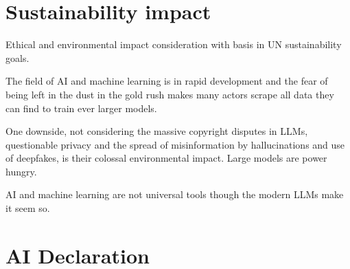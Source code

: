 \documentclass[../../thesis.tex]{subfiles}
\begin{document}
\section{Sustainability impact}
Ethical and environmental impact consideration with basis in UN sustainability goals.

The field of AI and machine learning is in rapid development and the fear of being left in the dust in the gold rush makes many actors scrape all data they can find to train ever larger models. 

One downside, not considering the massive copyright disputes in LLMs, questionable privacy and the spread of misinformation by hallucinations and use of deepfakes, is their colossal environmental impact. Large models are power hungry. 


AI and machine learning are not universal tools though the modern LLMs make it seem so.



\section{AI Declaration}
\end{document}
